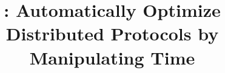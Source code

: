 \documentclass[sigplan]{acmart}
\begin{document}
\title{\sys{}: Automatically Optimize Distributed Protocols by Manipulating Time}

\author{}

\maketitle




{\footnotesize

}
\end{document}
